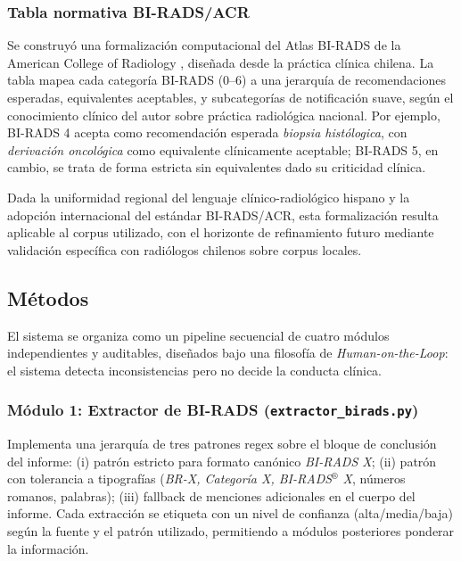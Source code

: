 \documentclass[10pt,journal,a4paper]{IEEEtran}
\newcommand{\codename}[1]{\texttt{#1}}
\begin{document}
\subsubsection{Tabla normativa BI-RADS/ACR}
Se construy\'o una formalizaci\'on computacional del Atlas BI-RADS de la American College of Radiology \cite{acr2013}, dise\~nada desde la pr\'actica cl\'inica chilena. La tabla mapea cada categor\'ia BI-RADS (0--6) a una jerarqu\'ia de recomendaciones esperadas, equivalentes aceptables, y subcategor\'ias de notificaci\'on suave, seg\'un el conocimiento cl\'inico del autor sobre pr\'actica radiol\'ogica nacional. Por ejemplo, BI-RADS 4 acepta como recomendaci\'on esperada \emph{biopsia hist\'ologica}, con \emph{derivaci\'on oncol\'ogica} como equivalente cl\'inicamente aceptable; BI-RADS 5, en cambio, se trata de forma estricta sin equivalentes dado su criticidad cl\'inica.

Dada la uniformidad regional del lenguaje cl\'inico-radiol\'ogico hispano y la adopci\'on internacional del est\'andar BI-RADS/ACR, esta formalizaci\'on resulta aplicable al corpus utilizado, con el horizonte de refinamiento futuro mediante validaci\'on espec\'ifica con radi\'ologos chilenos sobre corpus locales.

\subsection{M\'etodos}
El sistema se organiza como un pipeline secuencial de cuatro m\'odulos independientes y auditables, dise\~nados bajo una filosof\'ia de \emph{Human-on-the-Loop}: el sistema detecta inconsistencias pero no decide la conducta cl\'inica.

\subsubsection{M\'odulo 1: Extractor de BI-RADS (\codename{extractor\_birads.py})}
Implementa una jerarqu\'ia de tres patrones regex sobre el bloque de conclusi\'on del informe: (i) patr\'on estricto para formato can\'onico \emph{BI-RADS X}; (ii) patr\'on con tolerancia a tipograf\'ias (\emph{BR-X, Categor\'ia X, BI-RADS$^\circledR$ X}, n\'umeros romanos, palabras); (iii) fallback de menciones adicionales en el cuerpo del informe. Cada extracci\'on se etiqueta con un nivel de confianza (alta/media/baja) seg\'un la fuente y el patr\'on utilizado, permitiendo a m\'odulos posteriores ponderar la informaci\'on.
\end{document}
